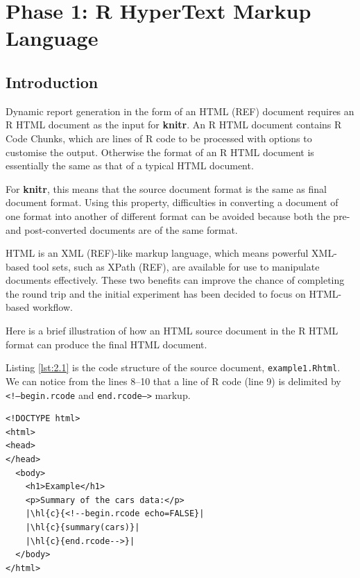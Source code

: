 \documentclass[a4paper, 12pt]{report}
\begin{document}
\chapter{Phase 1: R HyperText Markup Language}
\section{Introduction}
Dynamic report generation in the form of an HTML (REF) document requires an R HTML document as the input for \textbf{knitr}. An R HTML document contains R Code Chunks, which are lines of R code to be processed with options to customise the output. Otherwise the format of an R HTML document is essentially the same as that of a typical HTML document.

For \textbf{knitr}, this means that the source document format is the same as final document format. Using this property, difficulties in converting a document of one format into another of different format can be avoided because both the pre- and post-converted documents are of the same format.

HTML is an XML (REF)-like markup language, which means powerful XML-based tool sets, such as XPath (REF), are available for use to manipulate documents effectively. These two benefits can improve the chance of completing the round trip and the initial experiment has been decided to focus on HTML-based workflow.

Here is a brief illustration of how an HTML source document in the R HTML format can produce the final HTML document.

Listing \ref{lst:2.1} is the code structure of the source document, \texttt{example1.Rhtml}. We can notice from the lines 8--10 that a line of R code (line 9) is delimited by \texttt{<!--begin.rcode} and \texttt{end.rcode-->} markup.

\newcommand{\hl}[3][black]{{\fboxsep0.5pt\colorbox{#2}{\color{#1} #3}}}
\begin{lstlisting}[caption={\texttt{example1.Rhtml}}, escapechar=\|, label={lst:2.1}]
<!DOCTYPE html>
<html>
<head>
</head>
  <body>
    <h1>Example</h1>
    <p>Summary of the cars data:</p>
    |\hl{c}{<!--begin.rcode echo=FALSE}|
    |\hl{c}{summary(cars)}|
    |\hl{c}{end.rcode-->}|
  </body>
</html>
\end{lstlisting}
\end{document}
